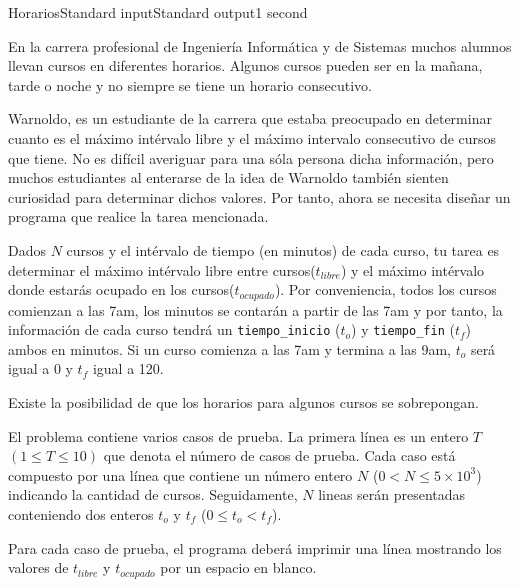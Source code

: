 \begin{problem}{Horarios}{Standard input}{Standard output}{1 second}{}


En la carrera profesional de Ingeniería Informática y de Sistemas muchos alumnos llevan cursos en diferentes horarios. Algunos cursos pueden ser en la mañana, tarde o noche y no siempre se tiene un horario consecutivo.

Warnoldo, es un estudiante de la carrera que estaba preocupado en determinar cuanto es el máximo intérvalo libre y el máximo intervalo consecutivo de cursos que tiene. No es difícil averiguar para una sóla persona dicha información, pero muchos estudiantes al enterarse de la idea de Warnoldo también sienten curiosidad para determinar dichos valores. Por tanto, ahora se necesita diseñar un programa que realice la tarea mencionada.

Dados $N$ cursos y el intérvalo de tiempo (en minutos) de cada curso, tu tarea es determinar el máximo intérvalo libre entre cursos($t_{libre}$) y el máximo intérvalo donde estarás ocupado en los cursos($t_{ocupado}$). Por conveniencia, todos los cursos comienzan a las 7am, los minutos se contarán a partir de las 7am y por tanto, la información de cada curso tendrá un \texttt{tiempo\_inicio} ($t_o$) y \texttt{tiempo\_fin} ($t_f$) ambos en minutos. Si un curso comienza a las 7am y termina a las 9am, $t_o$ será igual a 0 y $t_f$ igual a 120.  

Existe la posibilidad de que los horarios para algunos cursos se sobrepongan.

\InputFile
El problema contiene varios casos de prueba. La primera l\'inea es un entero $T$ $(1\leq T \leq 10)$ que denota el número de casos de prueba. Cada caso está compuesto por una l\'inea que contiene un número entero $N$ ($0<N\leq 5\times10^3$) indicando la cantidad de cursos. Seguidamente, $N$ lineas serán presentadas conteniendo dos enteros $t_o$ y $t_f$ ($0 \leq t_o < t_f$).

\OutputFile
Para cada caso de prueba, el programa deber\'a imprimir una línea mostrando los valores de $t_{libre}$ y $t_{ocupado}$ por un espacio en blanco.

\Example

\begin{example}
\end{example}

\end{problem}
